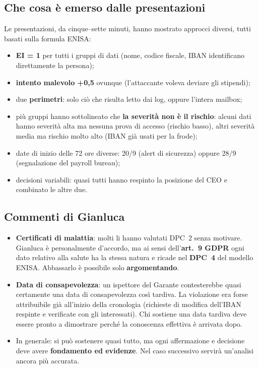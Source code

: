 \subsection{Che cosa è emerso dalle presentazioni}
Le presentazioni, da cinque--sette minuti, hanno mostrato approcci diversi, tutti basati sulla
formula ENISA:
\begin{itemize}
  \item \textbf{EI = 1} per tutti i gruppi di dati (nome, codice fiscale, IBAN identificano
    direttamente la persona);
  \item \textbf{intento malevolo +0,5} ovunque (l'attaccante voleva deviare gli stipendi);
  \item due \textbf{perimetri}: solo ciò che risulta letto dai log, oppure l'intera mailbox;
  \item più gruppi hanno sottolineato che \textbf{la severità non è il rischio}: alcuni dati hanno
    severità alta ma nessuna prova di accesso (rischio basso), altri severità media ma rischio molto
    alto (IBAN già usati per la frode);
  \item date di inizio delle 72 ore diverse: 20/9 (alert di sicurezza) oppure 28/9 (segnalazione del
    payroll bureau);
  \item decisioni variabili: quasi tutti hanno respinto la posizione del CEO e combinato le altre due.
\end{itemize}

\subsection{Commenti di Gianluca}
\begin{esame}
\begin{itemize}
  \item \textbf{Certificati di malattia}: molti li hanno valutati DPC~2 senza motivare. Gianluca è
    personalmente d'accordo, ma ai sensi dell'\textbf{art.~9 GDPR} ogni dato relativo alla salute ha
    la stessa natura e ricade nel \textbf{DPC~4} del modello ENISA. Abbassarlo è possibile solo
    \textbf{argomentando}.
  \item \textbf{Data di consapevolezza}: un ispettore del Garante contesterebbe quasi certamente una
    data di consapevolezza così tardiva. La violazione era forse attribuibile già all'inizio della
    cronologia (richieste di modifica dell'IBAN respinte e verificate con gli interessati). Chi
    sostiene una data tardiva deve essere pronto a dimostrare perché la conoscenza effettiva è
    arrivata dopo.
  \item In generale: si può sostenere quasi tutto, ma ogni affermazione e decisione deve avere
    \textbf{fondamento ed evidenze}. Nel caso successivo servirà un'analisi ancora più accurata.
\end{itemize}
\end{esame}

